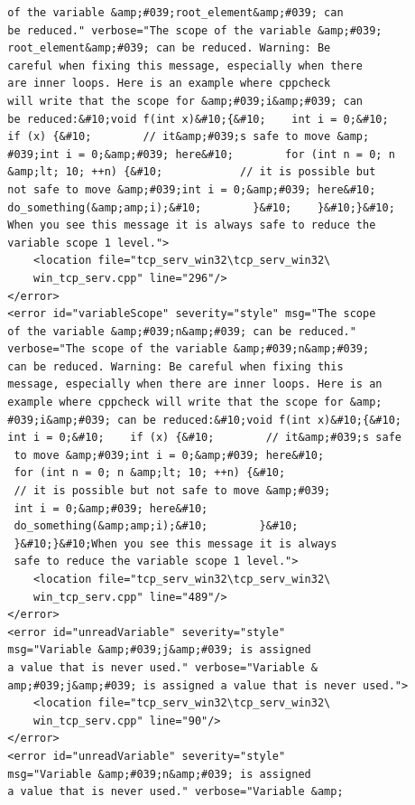 \documentclass[10pt,a4paper]{report}
\begin{document}
\begin{lstlisting}
        of the variable &amp;#039;root_element&amp;#039; can 
        be reduced." verbose="The scope of the variable &amp;#039;
        root_element&amp;#039; can be reduced. Warning: Be 
        careful when fixing this message, especially when there 
        are inner loops. Here is an example where cppcheck 
        will write that the scope for &amp;#039;i&amp;#039; can 
        be reduced:&#10;void f(int x)&#10;{&#10;    int i = 0;&#10;    
        if (x) {&#10;        // it&amp;#039;s safe to move &amp;
        #039;int i = 0;&amp;#039; here&#10;        for (int n = 0; n 
        &amp;lt; 10; ++n) {&#10;            // it is possible but 
        not safe to move &amp;#039;int i = 0;&amp;#039; here&#10;            
        do_something(&amp;amp;i);&#10;        }&#10;    }&#10;}&#10;
        When you see this message it is always safe to reduce the 
        variable scope 1 level.">
            <location file="tcp_serv_win32\tcp_serv_win32\
            win_tcp_serv.cpp" line="296"/>
        </error>
        <error id="variableScope" severity="style" msg="The scope 
        of the variable &amp;#039;n&amp;#039; can be reduced." 
        verbose="The scope of the variable &amp;#039;n&amp;#039; 
        can be reduced. Warning: Be careful when fixing this 
        message, especially when there are inner loops. Here is an 
        example where cppcheck will write that the scope for &amp;
        #039;i&amp;#039; can be reduced:&#10;void f(int x)&#10;{&#10;    
        int i = 0;&#10;    if (x) {&#10;        // it&amp;#039;s safe
         to move &amp;#039;int i = 0;&amp;#039; here&#10;        
         for (int n = 0; n &amp;lt; 10; ++n) {&#10;            
         // it is possible but not safe to move &amp;#039;
         int i = 0;&amp;#039; here&#10;            
         do_something(&amp;amp;i);&#10;        }&#10;    
         }&#10;}&#10;When you see this message it is always 
         safe to reduce the variable scope 1 level.">
            <location file="tcp_serv_win32\tcp_serv_win32\
            win_tcp_serv.cpp" line="489"/>
        </error>
        <error id="unreadVariable" severity="style" 
        msg="Variable &amp;#039;j&amp;#039; is assigned 
        a value that is never used." verbose="Variable &
        amp;#039;j&amp;#039; is assigned a value that is never used.">
            <location file="tcp_serv_win32\tcp_serv_win32\
            win_tcp_serv.cpp" line="90"/>
        </error>
        <error id="unreadVariable" severity="style" 
        msg="Variable &amp;#039;n&amp;#039; is assigned 
        a value that is never used." verbose="Variable &amp;

\end{lstlisting}
\end{document}
